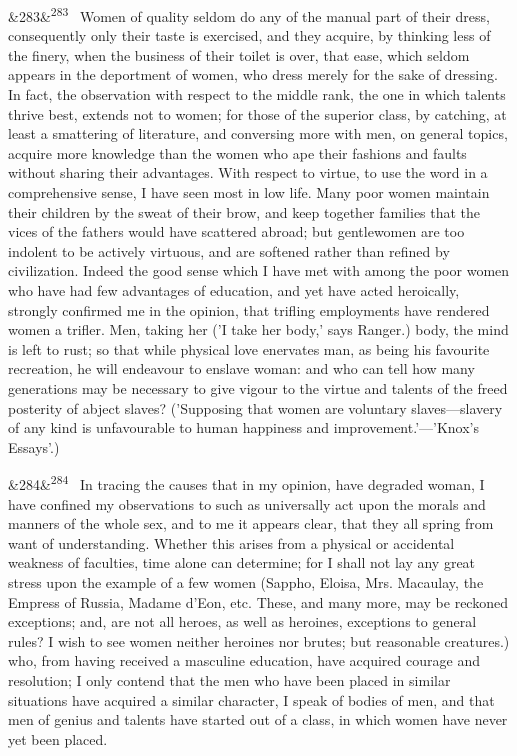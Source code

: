 \documentclass[12pt]{article}
\newcommand{\para}[1][]{\par\noindent\ifx&#1&\else\textsuperscript{\footnotesize #1}~\fi}
\begin{document}
\para[283] Women of quality seldom do any of the manual part of their dress, consequently only their taste is exercised, and they acquire, by thinking less of the finery, when the business of their toilet is over, that ease, which seldom appears in the deportment of women, who dress merely for the sake of dressing. In fact, the observation with respect to the middle rank, the one in which talents thrive best, extends not to women; for those of the superior class, by catching, at least a smattering of literature, and conversing more with men, on general topics, acquire more knowledge than the women who ape their fashions and faults without sharing their advantages. With respect to virtue, to use the word in a comprehensive sense, I have seen most in low life. Many poor women maintain their children by the sweat of their brow, and keep together families that the vices of the fathers would have scattered abroad; but gentlewomen are too indolent to be actively virtuous, and are softened rather than refined by civilization. Indeed the good sense which I have met with among the poor women who have had few advantages of education, and yet have acted heroically, strongly confirmed me in the opinion, that trifling employments have rendered women a trifler. Men, taking her ('I take her body,' says Ranger.) body, the mind is left to rust; so that while physical love enervates man, as being his favourite recreation, he will endeavour to enslave woman: and who can tell how many generations may be necessary to give vigour to the virtue and talents of the freed posterity of abject slaves? ('Supposing that women are voluntary slaves---slavery of any kind is unfavourable to human happiness and improvement.'---'Knox's Essays'.)

\para[284] In tracing the causes that in my opinion, have degraded woman, I have confined my observations to such as universally act upon the morals and manners of the whole sex, and to me it appears clear, that they all spring from want of understanding. Whether this arises from a physical or accidental weakness of faculties, time alone can determine; for I shall not lay any great stress upon the example of a few women (Sappho, Eloisa, Mrs. Macaulay, the Empress of Russia, Madame d'Eon, etc. These, and many more, may be reckoned exceptions; and, are not all heroes, as well as heroines, exceptions to general rules? I wish to see women neither heroines nor brutes; but reasonable creatures.) who, from having received a masculine education, have acquired courage and resolution; I only contend that the men who have been placed in similar situations have acquired a similar character, I speak of bodies of men, and that men of genius and talents have started out of a class, in which women have never yet been placed.
\end{document}
